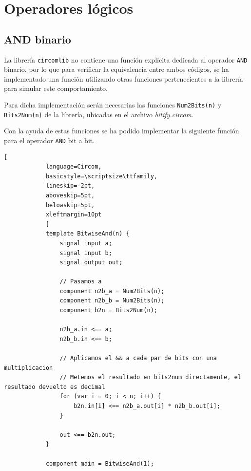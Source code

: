 \documentclass[a4paper,12pt]{report}
\begin{document}
	\section{Operadores lógicos}    
	\subsection{AND binario}
	\label{sec:ver-andbinario}
	\noindent La librería \texttt{circomlib} no contiene una función explícita dedicada al operador \texttt{AND} binario, por lo que para verificar la equivalencia entre ambos códigos, se ha implementado una función utilizando otras funciones pertenecientes a la librería para simular este comportamiento.
	
	\vspace{0.2cm}
	\noindent Para dicha implementación serán necesarias las funciones \texttt{Num2Bits(n)} y \texttt{Bits2Num(n)} de la librería, ubicadas en el archivo \textit{bitify.circom}.
	
	\vspace{0.2cm}
	\noindent Con la ayuda de estas funciones se ha podido implementar la siguiente función para el operador \texttt{AND} bit a bit.
	
	\begin{mi_ejemplo}
		\caption{Creación de AND bit a bit usando funciones de circomlib}
		\label{ex:andb-circomlib}
		\begin{lstlisting}[
			language=Circom,
			basicstyle=\scriptsize\ttfamily, 
			lineskip=-2pt,                  
			aboveskip=5pt,                  
			belowskip=5pt,                  
			xleftmargin=10pt
			]
			template BitwiseAnd(n) {
				signal input a;
				signal input b;
				signal output out;
				
				// Pasamos a
				component n2b_a = Num2Bits(n);
				component n2b_b = Num2Bits(n);
				component b2n = Bits2Num(n);
				
				n2b_a.in <== a;
				n2b_b.in <== b;
				
				// Aplicamos el && a cada par de bits con una multiplicacion
				// Metemos el resultado en bits2num directamente, el resultado devuelto es decimal
				for (var i = 0; i < n; i++) {
					b2n.in[i] <== n2b_a.out[i] * n2b_b.out[i];
				}
				
				out <== b2n.out;
			}
			
			component main = BitwiseAnd(1);
			
		\end{lstlisting}
	\end{mi_ejemplo}
	
\end{document}
